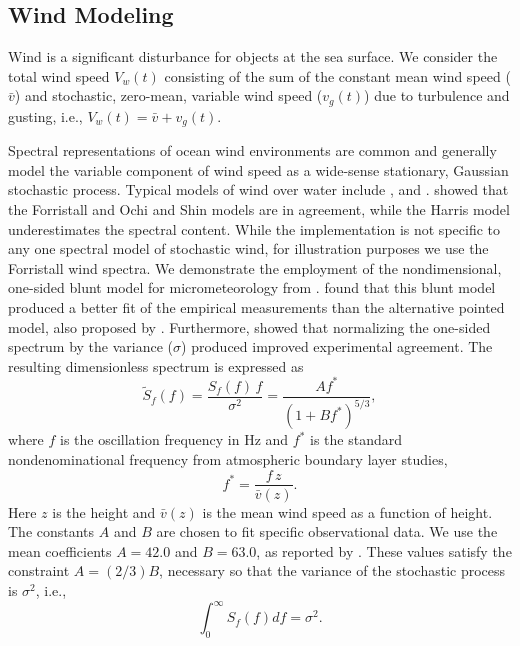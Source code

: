 \documentclass[utf8]{frontiersSCNS} %
\begin{document}
\subsection{Wind Modeling}\label{s:wind_model}
Wind is a significant disturbance for objects at the sea surface. We consider the total wind speed $V_w(t)$ consisting of the sum of the constant mean wind speed ($\bar{v}$) and stochastic, zero-mean, variable wind speed ($v_g(t)$) due to turbulence and gusting, i.e., $V_w(t)=\bar{v}+v_g(t)$.


Spectral representations of ocean wind environments are common and generally model the variable component of wind speed as a wide-sense stationary, Gaussian stochastic process. Typical models of wind over water include \citet{harris71nature}, \citet{forristall88wind} and \citet{ochi13wind}. \citet{cole18reactive} showed that the Forristall and Ochi and Shin models are in agreement, while the Harris model underestimates the spectral content. While the implementation is not specific to any one spectral model of stochastic wind, for illustration purposes we use the Forristall wind spectra. \color{blue}We demonstrate the employment of the nondimensional, one-sided blunt model for micrometeorology from \citet{olesen84modelling}. \citet{forristall88wind} found that this blunt model produced a better fit of the empirical measurements than the alternative pointed model, also proposed by \citet{olesen84modelling}. Furthermore, \citet{forristall88wind} showed that normalizing the one-sided spectrum by the variance ($\sigma$) produced improved experimental agreement. The resulting dimensionless spectrum is expressed as 
\begin{equation}
  \widetilde{S}_f(f) = \frac{S_f(f)\,f}{\sigma^2}  = \frac{ A f^*}{( 1 + B f^*)^{5/3}},
    \label{e:forristall}
    \end{equation}
where $f$ is the oscillation frequency in \unit[]{Hz} and $f^*$ is the standard nondenominational frequency from atmospheric boundary layer studies,
\begin{equation}
  f^* = \frac{f \, z}{\bar{v}(z)}.
\end{equation}
Here $z$ is the height and $\bar{v}(z)$ is the mean wind speed as a function of height. The constants $A$ and $B$ are chosen to fit specific observational data. We use the mean coefficients $A=42.0$ and $B=63.0$, as reported by \citet{forristall88wind}. These values satisfy the constraint $A=(2/3)B$, necessary so that the variance of the stochastic process is $\sigma^2$, i.e.,
\begin{equation}
  \int_0^{\infty} S_f(f) df = \sigma^2.
\end{equation}
\end{document}
